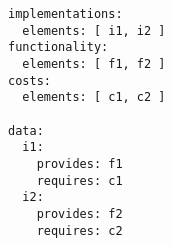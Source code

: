 \par\begin{minipage}{60ex}
\begin{verbatim}
implementations:
  elements: [ i1, i2 ]
functionality:
  elements: [ f1, f2 ]
costs:
  elements: [ c1, c2 ]

data:
  i1:
    provides: f1
    requires: c1
  i2:
    provides: f2
    requires: c2

\end{verbatim}
\end{minipage}\par